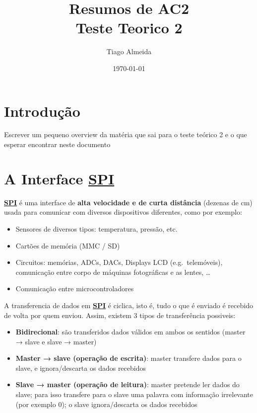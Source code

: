 \documentclass[a4paper, 12pt, onecolumn, twoside]{article}
\title{%
  Resumos de AC2 \\
  \large Teste Teorico 2}
\author{Tiago Almeida}
\date{\today}
\begin{document}
\maketitle

\tableofcontents

\section{Introdução}
Escrever um pequeno overview da matéria que sai para o teste teórico 2
e o que esperar encontrar neste documento

\clearpage

\section{A Interface \hyperref[spi]{\textbf{\large{SPI}}}}
\hyperref[spi]{\textbf{SPI}} é uma interface de \textbf{alta velocidade e de curta distância} (dezenas de cm) usada para comunicar com
diversos dispositivos diferentes, como por exemplo:
\begin{itemize}
    \item Sensores de diversos tipos: temperatura, pressão, etc.
    \item Cartões de memória (MMC / SD)
    \item Circuitos: memórias, ADCs, DACs, Displays LCD (e.g.\ telemóveis),
    comunicação entre corpo de máquinas fotográficas e as lentes, \ldots
    \item Comunicação entre microcontroladores
\end{itemize}

A transferencia de dados em \hyperref[spi]{\textbf{SPI}} é ciclica, isto é, tudo o que é enviado é recebido de volta por quem enviou.
Assim, existem 3 tipos de transferência possiveis:
\begin{itemize}
    \item \textbf{Bidirecional}: são transferidos dados válidos em ambos os sentidos
    (master → slave e slave → master)
    \item \textbf{Master → slave (operação de escrita)}: master transfere dados
    para o slave, e ignora/descarta os dados recebidos
    \item \textbf{Slave → master (operação de leitura)}: master pretende ler dados do slave; 
    para isso transfere para o slave uma palavra com informação irrelevante (por exemplo 0); 
    o slave ignora/descarta os dados recebidos
\end{itemize}
\end{document}

